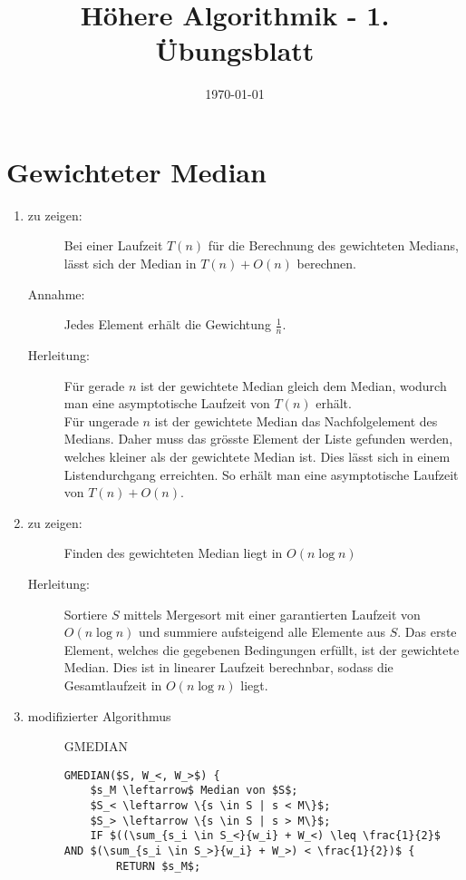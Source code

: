 \documentclass[a4paper,10pt]{scrartcl}
\title{H\"ohere Algorithmik - 1. \"Ubungsblatt}
\author{\Authors}
\date{\today}
\begin{document}
\maketitle

\section{Gewichteter Median}
\begin{enumerate}
\item \begin{description}
	\item[zu zeigen:] Bei einer Laufzeit $T(n)$ für die Berechnung des gewichteten Medians, lässt sich der Median in $T(n) + O(n)$ berechnen.
	\item[Annahme:] Jedes Element erhält die Gewichtung $\frac{1}{n}$.
	\item[Herleitung:] Für gerade $n$ ist der gewichtete Median gleich dem Median, wodurch man eine asymptotische Laufzeit von $T(n)$ erh\"alt.\\
Für ungerade $n$ ist der gewichtete Median das Nachfolgelement des Medians. Daher muss das gr\"osste Element der Liste gefunden werden, welches kleiner als der gewichtete Median ist. Dies lässt sich in einem Listendurchgang erreichten. So erh\"alt man eine asymptotische Laufzeit von $T(n) + O(n)$.
	\end{description}
\item   \begin{description}
	\item[zu zeigen:] Finden des gewichteten Median liegt in $O(n \log n)$
	\item[Herleitung:] Sortiere $S$ mittels Mergesort mit einer garantierten Laufzeit von $O(n \log n)$ und summiere aufsteigend alle Elemente aus $S$. Das erste Element, welches die gegebenen Bedingungen erf\"ullt, ist der gewichtete Median. Dies ist in linearer Laufzeit berechnbar, sodass die Gesamtlaufzeit in $O(n \log n)$ liegt.
	\end{description}
\item  \begin{description}
	\item[modifizierter Algorithmus] GMEDIAN
	\begin{lstlisting}[mathescape=true]
GMEDIAN($S, W_<, W_>$) {
	$s_M \leftarrow$ Median von $S$;
	$S_< \leftarrow \{s \in S | s < M\}$;
	$S_> \leftarrow \{s \in S | s > M\}$;
	IF $((\sum_{s_i \in S_<}{w_i} + W_<) \leq \frac{1}{2}$ AND $(\sum_{s_i \in S_>}{w_i} + W_>) < \frac{1}{2})$ {
		RETURN $s_M$;

\end{lstlisting}
\end{description}
\end{enumerate}
\end{document}

